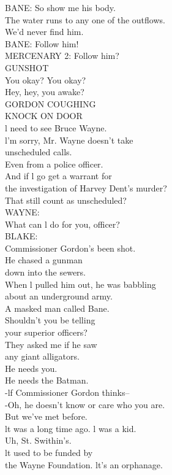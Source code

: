 \documentclass{article}
\begin{document}
\begin{multicols}{3}
BANE: So show me his body.\\
The water runs to any one of the outflows.\\
We'd never find him.\\
BANE: Follow him!\\
MERCENARY 2: Follow him?\\
GUNSHOT\\
You okay? You okay?\\
Hey, hey, you awake?\\
GORDON COUGHING\\
KNOCK ON DOOR\\
l need to see Bruce Wayne.\\
l'm sorry, Mr. Wayne doesn't take\\
unscheduled calls.\\
Even from a police officer.\\
And if l go get a warrant for\\
the investigation of Harvey Dent's murder?\\
That still count as unscheduled?\\
WAYNE:\\
What can l do for you, officer?\\
BLAKE:\\
Commissioner Gordon's been shot.\\
He chased a gunman\\
down into the sewers.\\
When l pulled him out, he was babbling\\
about an underground army.\\
A masked man called Bane.\\
Shouldn't you be telling\\
your superior officers?\\
They asked me if he saw\\
any giant alligators.\\
He needs you.\\
He needs the Batman.\\
-lf Commissioner Gordon thinks--\\
-Oh, he doesn't know or care who you are.\\
But we've met before.\\
lt was a long time ago. l was a kid.\\
Uh, St. Swithin's.\\
lt used to be funded by\\
the Wayne Foundation. lt's an orphanage.\\

\end{multicols}
\end{document}
